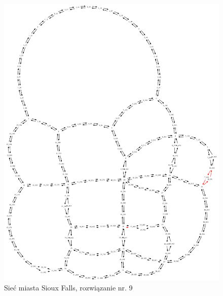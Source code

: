 \documentclass[twoside,12pt]{report}
\begin{document}
\begin{figure}[ht]
\centering
\includegraphics[totalheight=0.580\textheight, angle=90]{img/sioux-out/9/network2}
\caption{Sieć miasta Sioux Falls, rozwiązanie nr. 9}
\label{sioux9}
\end{figure}
\end{document}
